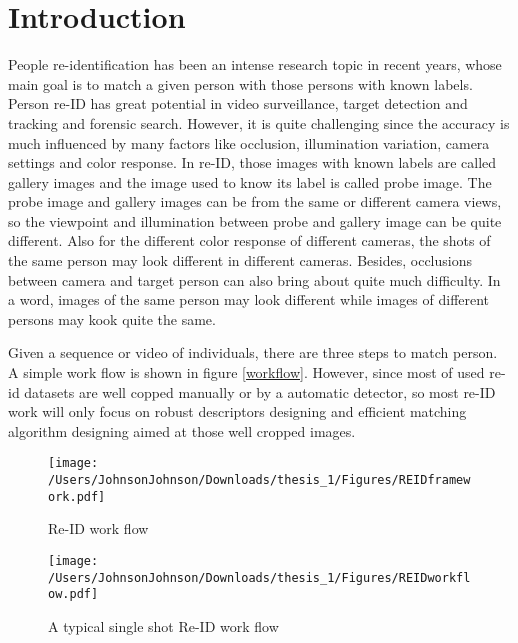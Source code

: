 \chapter{Introduction}

People re-identification has been an intense research topic in recent years, whose main goal is to match a given person with those persons with known labels. Person re-ID has great potential in video surveillance, target detection and tracking and forensic search. However, it is quite challenging since the accuracy is much influenced by many factors like occlusion, illumination variation, camera settings and color response. In re-ID, those images with known labels are called gallery images and the image used to know its label is called probe image. The probe image and gallery images can be from the same or different camera views, so the viewpoint and illumination between probe and gallery image can be quite different. Also for the different color response of different cameras, the shots of the same person may look different in different cameras. Besides, occlusions between camera and target person can also bring about quite much difficulty.  In a word, images of the same person may look different while images of different persons may kook quite the same. 

Given a sequence or video of individuals, there are three steps to match person. A simple work flow is shown in figure \ref{workflow}. However, since most of used re-id datasets are well copped manually or by a automatic detector, so most re-ID work will only focus on robust descriptors designing and efficient matching algorithm designing aimed at those well cropped images. 


\begin{figure}
\centering
\begin{raggedleft}
\texttt{[image: /Users/JohnsonJohnson/Downloads/thesis\_1/Figures/REIDframework.pdf]}
\vspace{1em}
\caption{Re-ID work flow}
\end{raggedleft}
\end{figure}
\label{workflow}

\begin{figure}
\centering
\texttt{[image: /Users/JohnsonJohnson/Downloads/thesis\_1/Figures/REIDworkflow.pdf]}
\vspace{1em}
\caption{A typical single shot Re-ID work flow}
\end{figure}




